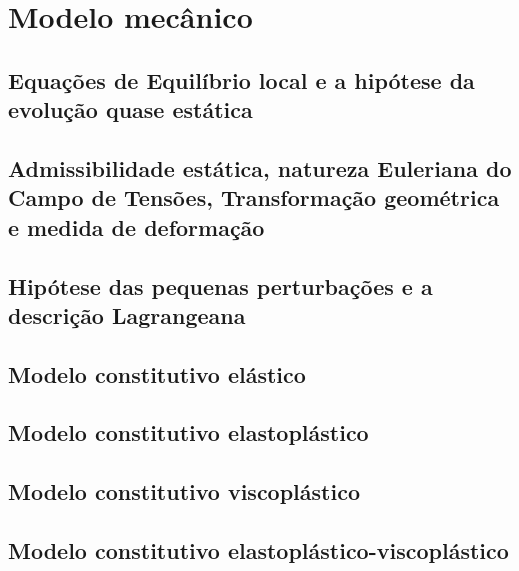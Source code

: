 \chapter{Modelo mecânico}

\section{Equações de Equilíbrio local e a hipótese da evolução quase estática}


\section{Admissibilidade estática, natureza Euleriana do Campo de Tensões, Transformação geométrica e medida de deformação}

\section{Hipótese das pequenas perturbações e a descrição Lagrangeana}

\section{Modelo constitutivo elástico}

\section{Modelo constitutivo elastoplástico}

\section{Modelo constitutivo viscoplástico}


\section{Modelo constitutivo elastoplástico-viscoplástico}







